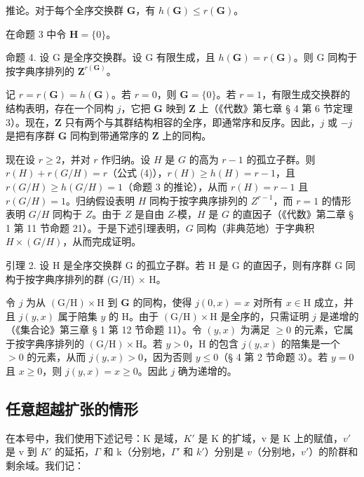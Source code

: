 推论。对于每个全序交换群 \(\mathbf{G}\)，有 \(h(\mathbf{G}) \leqslant r(\mathbf{G})\)。

在命题 3 中令 \(\mathbf{H} = \{0\}\)。

命题 4. 设 G 是全序交换群。设 G 有限生成，且 \(h(\mathbf{G}) = r(\mathbf{G})\)。则 G 同构于按字典序排列的 \(\mathbf{Z}^{r(\mathbf{G})}\)。

记 \(r = r(\mathbf{G}) = h(\mathbf{G})\)。若 \(r = 0\)，则 \(\mathbf{G} = \{0\}\)。若 \(r = 1\)，有限生成交换群的结构表明，存在一个同构 \(j\)，它把 \(\mathbf{G}\) 映到 \(\mathbf{Z}\) 上（《代数》第七章 § 4 第 6 节定理 3）。现在，\(\mathbf{Z}\) 只有两个与其群结构相容的全序，即通常序和反序。因此，\(j\) 或 \(-j\) 是把有序群 \(\mathbf{G}\) 同构到带通常序的 \(\mathbf{Z}\) 上的同构。

现在设 \(r \geqslant 2\)，并对 \(r\) 作归纳。设 \(H\) 是 \(G\) 的高为 \(r - 1\) 的孤立子群。则 \(r(H) + r(G/H) = r\)（公式 (4)），\(r(H) \geqslant h(H) = r - 1\)，且 \(r(G/H) \geqslant h(G/H) = 1\)（命题 3 的推论），从而 \(r(H) = r - 1\) 且 \(r(G/H) = 1\)。归纳假设表明 \(H\) 同构于按字典序排列的 \(Z^{r-1}\)，而 \(r = 1\) 的情形表明 \(G/H\) 同构于 \(Z\)。由于 \(Z\) 是自由 \(Z\)-模，\(H\) 是 \(G\) 的直因子（《代数》第二章 § 1 第 11 节命题 21）。于是下述引理表明，\(G\) 同构（非典范地）于字典积 \(H \times (G/H)\)，从而完成证明。

引理 2. 设 H 是全序交换群 G 的孤立子群。若 H 是 G 的直因子，则有序群 G 同构于按字典序排列的群 (G/H) × H。

令 \(j\) 为从 \((\mathrm{G} / \mathrm{H}) \times \mathrm{H}\) 到 \(\mathbf{G}\) 的同构，使得 \(j(0, x) = x\) 对所有 \(x \in \mathrm{H}\) 成立，并且 \(j(y, x)\) 属于陪集 \(y\) 的 \(\mathrm{H}\)。由于 \((\mathrm{G} / \mathrm{H}) \times \mathrm{H}\) 是全序的，只需证明 \(j\) 是递增的（《集合论》第三章 § 1 第 12 节命题 11）。令 \((y, x)\) 为满足 \(\geqslant 0\) 的元素，它属于按字典序排列的 \((\mathrm{G} / \mathrm{H}) \times \mathrm{H}\)。若 \(y > 0\)，\(\mathrm{H}\) 的包含 \(j(y, x)\) 的陪集是一个 \(> 0\) 的元素，从而 \(j(y, x) > 0\)，因为否则 \(y \leqslant 0\)（§ 4 第 2 节命题 3）。若 \(y = 0\) 且 \(x \geqslant 0\)，则 \(j(y, x) = x \geqslant 0\)。因此 \(j\) 确为递增的。

\subsection{任意超越扩张的情形}

在本号中，我们使用下述记号：K 是域，\(K'\) 是 K 的扩域，v 是 K 上的赋值，\(v'\) 是 v 到 \(K'\) 的延拓，\(\Gamma\) 和 k（分别地，\(\Gamma'\) 和 \(k'\)）分别是 \(v\)（分别地，\(v'\)）的阶群和剩余域。我们记：

